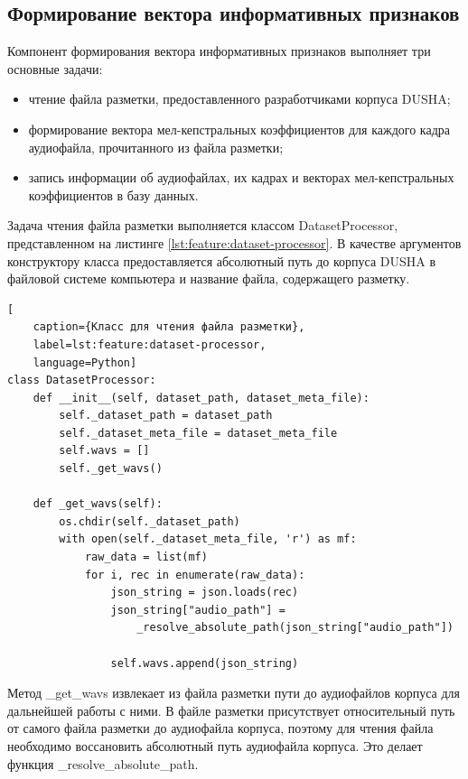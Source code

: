 \subsection{Формирование вектора информативных признаков}
Компонент формирования вектора информативных признаков выполняет три основные задачи:
\begin{itemize}
	\item чтение файла разметки, предоставленного разработчиками корпуса DUSHA;
	\item формирование вектора мел-кепстральных коэффициентов для каждого кадра аудиофайла, прочитанного из файла разметки;
	\item запись информации об аудиофайлах, их кадрах и векторах мел-кепстральных коэффициентов в базу данных.
\end{itemize}
Задача чтения файла разметки выполняется классом DatasetProcessor, представленном на листинге \ref{lst:feature:dataset-processor}. В качестве аргументов конструктору класса предоставляется абсолютный путь до корпуса DUSHA в файловой системе компьютера и название файла, содержащего разметку.
\begin{lstlisting}[
	caption={Класс для чтения файла разметки},
	label=lst:feature:dataset-processor,
	language=Python]
class DatasetProcessor:
    def __init__(self, dataset_path, dataset_meta_file):
        self._dataset_path = dataset_path
        self._dataset_meta_file = dataset_meta_file
        self.wavs = []
        self._get_wavs()

    def _get_wavs(self):
        os.chdir(self._dataset_path)
        with open(self._dataset_meta_file, 'r') as mf:
            raw_data = list(mf)
            for i, rec in enumerate(raw_data):
                json_string = json.loads(rec)
                json_string["audio_path"] =
                	_resolve_absolute_path(json_string["audio_path"])
                	
                self.wavs.append(json_string)
\end{lstlisting}
Метод \_get\_wavs извлекает из файла разметки пути до аудиофайлов корпуса для дальнейшей работы с ними. В файле разметки присутствует относительный путь от самого файла разметки до аудиофайла корпуса, поэтому для чтения файла необходимо воссановить абсолютный путь аудиофайла корпуса. Это делает функция \_resolve\_absolute\_path.

